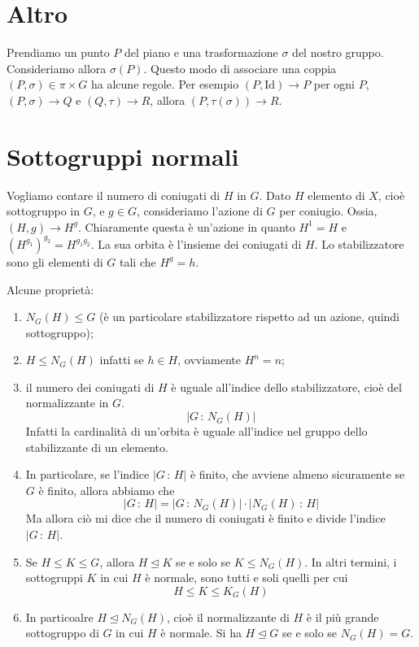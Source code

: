 \documentclass[a4paper]{article}
\begin{document}
\section{Altro}

Prendiamo un punto \(P\) del piano e una trasformazione \(\sigma\) del nostro gruppo.
Consideriamo allora \(\sigma(P)\). Questo modo di associare una coppia
\((P, \sigma) \in \pi \times G\) ha alcune regole.
Per esempio \((P, \text{Id}) \to P\) per ogni \(P\),
\((P, \sigma) \to Q\) e \((Q, \tau) \to R\), allora \((P, \tau(\sigma)) \to R\).

\section{Sottogruppi normali}

Vogliamo contare il numero di coniugati di \(H\) in \(G\).
Dato \(H\) elemento di \(X\), cioè sottogruppo in \(G\),
e \(g\in G\), consideriamo l'azione di \(G\) per coniugio.
Ossia, \((H,g) \to H^g\). Chiaramente questa è un'azione in quanto
\(H^1 = H\) e \({(H^{g_1})}^{g_2} = H^{g_1g_2}\).
La sua orbita è l'insieme dei coniugati di \(H\). Lo stabilizzatore
sono gli elementi di \(G\) tali che \(H^g = h\).


Alcune proprietà:
\begin{enumerate}
    \item \(N_G(H) \leq G\) (è un particolare stabilizzatore rispetto ad un azione, quindi sottogruppo);
    \item \(H \leq N_G(H)\) infatti se \(h \in H\), ovviamente \(H^n = n\);
    \item il numero dei coniugati di \(H\) è uguale all'indice dello stabilizzatore, cioè del normalizzante in \(G\).
    \[
        |G\,:\, N_G(H)|
    \]
    Infatti la cardinalità di un'orbita è uguale all'indice nel gruppo dello stabilizzante di un elemento.
    \item In particolare, se l'indice \(|G\,:\,H|\) è finito, che avviene
    almeno sicuramente se \(G\) è finito, allora abbiamo che
    \[
        |G\,:\, H| = |G \,:\, N_G(H)| \cdot |N_G(H) \,:\, H|
    \]
    Ma allora ciò mi dice che il numero di coniugati è finito e
    divide l'indice \(|G \,:\, H|\).
    \item Se \(H \leq K \leq G\), allora \(H \unlhd K\) se e solo se
    \(K \leq N_G(H)\). In altri termini, i sottogruppi \(K\)
    in cui \(H\) è normale, sono tutti e soli quelli per cui
    \[
        H \leq K \leq K_G(H)
    \]
    \item In particoalre \(H \unlhd N_G(H)\), cioè il normalizzante
    di \(H\) è il più grande sottogruppo di \(G\) in cui \(H\) è normale.
    Si ha \(H \unlhd G\) se e solo se \(N_G(H) = G\).
\end{enumerate}
\end{document}
